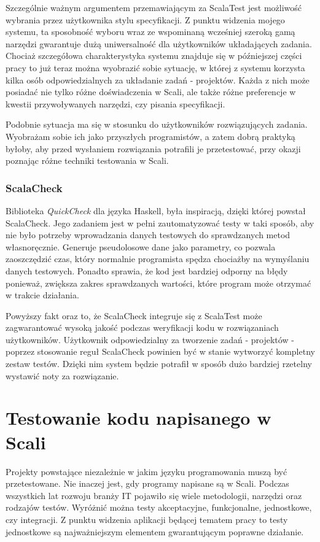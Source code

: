 \documentclass[brudnopis]{xmgr}
\begin{document}
Szczególnie ważnym argumentem przemawiającym za ScalaTest jest możliwość wybrania przez użytkownika stylu specyfikacji. Z punktu widzenia mojego systemu, ta sposobność wyboru wraz ze wspominaną wcześniej szeroką gamą narzędzi gwarantuje dużą uniwersalność dla użytkowników układających zadania. Chociaż szczegółowa charakterystyka systemu znajduje się w późniejszej części pracy to już teraz można wyobrazić sobie sytuację, w której z systemu korzysta kilka osób odpowiedzialnych za układanie zadań - projektów. Każda z nich może posiadać nie tylko różne doświadczenia w Scali, ale także różne preferencje w kwestii przywoływanych narzędzi, czy pisania specyfikacji. 

Podobnie sytuacja ma się w stosunku do użytkowników rozwiązujących zadania. Wyobrażam sobie ich jako przyszłych programistów, a zatem dobrą praktyką byłoby, aby przed wysłaniem rozwiązania potrafili je przetestować, przy okazji poznając różne techniki testowania w Scali. 

\subsection{ScalaCheck}

Biblioteka \emph{QuickCheck} dla języka Haskell, była inspiracją, dzięki której powstał ScalaCheck. Jego zadaniem jest w pełni zautomatyzować testy w taki sposób, aby nie było potrzeby wprowadzania danych testowych do sprawdzanych metod własnoręcznie. Generuje pseudolosowe dane jako parametry, co pozwala zaoszczędzić czas, który normalnie programista spędza chociażby na wymyślaniu danych testowych. Ponadto sprawia, że kod jest bardziej odporny na błędy ponieważ, zwiększa zakres sprawdzanych wartości, które program może otrzymać w trakcie działania.

Powyższy fakt oraz to, że ScalaCheck integruje się z ScalaTest może zagwarantować wysoką jakość podczas weryfikacji kodu w rozwiązaniach użytkowników. Użytkownik odpowiedzialny za tworzenie zadań - projektów - poprzez stosowanie reguł ScalaCheck powinien być w stanie wytworzyć kompletny zestaw testów. Dzięki nim system będzie potrafił w sposób dużo bardziej rzetelny wystawić noty za rozwiązanie.
      
\chapter{Testowanie kodu napisanego w Scali}      

Projekty powstające niezależnie w jakim języku programowania muszą być przetestowane. Nie inaczej jest, gdy programy napisane są w Scali. Podczas wszystkich lat rozwoju branży IT pojawiło się wiele metodologii, narzędzi oraz rodzajów testów. Wyróżnić można testy akceptacyjne, funkcjonalne, jednostkowe, czy integracji. Z punktu widzenia aplikacji będącej tematem pracy to testy jednostkowe są najważniejszym elementem gwarantującym poprawne działanie.       
      
\end{document}
